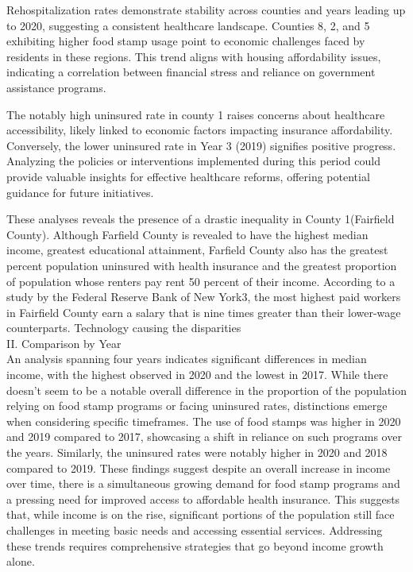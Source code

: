 \documentclass[12pt]{article}
\begin{document}
Rehospitalization rates demonstrate stability across counties and years leading up to 2020, suggesting 
a consistent healthcare landscape. Counties 8, 2, and 5 exhibiting higher food stamp usage point to economic 
challenges faced by residents in these regions. This trend aligns with housing affordability issues, 
indicating a correlation between financial stress and reliance on government assistance programs.

The notably high uninsured rate in county 1 raises concerns about healthcare accessibility, likely 
linked to economic factors impacting insurance affordability. Conversely, the lower uninsured rate in 
Year 3 (2019) signifies positive progress. Analyzing the policies or interventions implemented during 
this period could provide valuable insights for effective healthcare reforms, offering potential guidance 
for future initiatives.

These analyses reveals the presence of a drastic inequality in County 1(Fairfield County). Although Farfield County
is revealed to have the highest median income, greatest educational attainment, Farfield County also has the greatest 
percent population uninsured with health insurance and the greatest proportion of population whose renters pay rent 
50 percent of their income. According to a study by the Federal Reserve Bank of New York{3}, the most highest paid 
workers in Fairfield County earn a salary that is nine times greater than their lower-wage counterparts. Technology causing the disparities
\\
II. Comparison by Year
\\
An analysis spanning four years indicates significant differences in median income, with the highest observed 
in 2020 and the lowest in 2017. While there doesn't seem to be a notable overall difference in the proportion 
of the population relying on food stamp programs or facing uninsured rates, distinctions emerge when considering 
specific timeframes. The use of food stamps was higher in 2020 and 2019 compared to 2017, showcasing a 
shift in reliance on such programs over the years. Similarly, the uninsured rates were notably higher in 2020 and 
2018 compared to 2019. These findings suggest despite an overall increase in income over time, there is a simultaneous 
growing demand for food stamp programs and a pressing need for improved access to affordable health insurance. 
This suggests that, while income is on the rise, significant portions of the population still face challenges in
 meeting basic needs and accessing essential services. Addressing these trends requires comprehensive strategies 
 that go beyond income growth alone.
\end{document}
